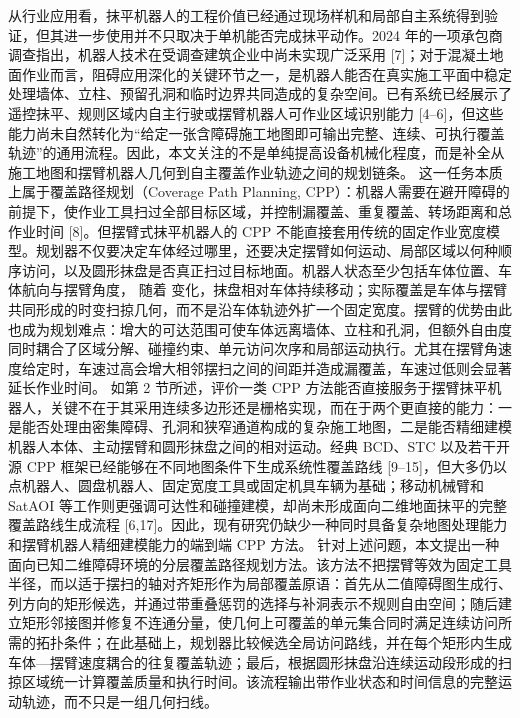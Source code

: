 {}从行业应用看，抹平机器人的工程价值已经通过现场样机和局部自主系统得到验证，但其进一步使用并不只取决于单机能否完成抹平动作。2024 年的一项承包商调查指出，机器人技术在受调查建筑企业中尚未实现广泛采用 [7]；对于混凝土地面作业而言，阻碍应用深化的关键环节之一，是机器人能否在真实施工平面中稳定处理墙体、立柱、预留孔洞和临时边界共同造成的复杂空间。已有系统已经展示了遥控抹平、规则区域内自主行驶或摆臂机器人可作业区域识别能力 [4–6]，但这些能力尚未自然转化为“给定一张含障碍施工地图即可输出完整、连续、可执行覆盖轨迹”的通用流程。因此，本文关注的不是单纯提高设备机械化程度，而是补全从施工地图和摆臂机器人几何到自主覆盖作业轨迹之间的规划链条。\markdownRendererParagraphSeparator
{}这一任务本质上属于覆盖路径规划（Coverage Path Planning, CPP）：机器人需要在避开障碍的前提下，使作业工具扫过全部目标区域，并控制漏覆盖、重复覆盖、转场距离和总作业时间 [8]。但摆臂式抹平机器人的 CPP 不能直接套用传统的固定作业宽度模型。规划器不仅要决定车体经过哪里，还要决定摆臂如何运动、局部区域以何种顺序访问，以及圆形抹盘是否真正扫过目标地面。机器人状态至少包括车体位置、车体航向与摆臂角度，\markdownRendererParagraphSeparator
{}\markdownRendererParagraphSeparator
{}随着 \markdownRendererInlineMath{\phi} 变化，抹盘相对车体持续移动；实际覆盖是车体与摆臂共同形成的时变扫掠几何，而不是沿车体轨迹外扩一个固定宽度。摆臂的优势由此也成为规划难点：增大的可达范围可使车体远离墙体、立柱和孔洞，但额外自由度同时耦合了区域分解、碰撞约束、单元访问次序和局部运动执行。尤其在摆臂角速度给定时，车速过高会增大相邻摆扫之间的间距并造成漏覆盖，车速过低则会显著延长作业时间。\markdownRendererParagraphSeparator
{}如第 2 节所述，评价一类 CPP 方法能否直接服务于摆臂抹平机器人，关键不在于其采用连续多边形还是栅格实现，而在于两个更直接的能力：一是能否处理由密集障碍、孔洞和狭窄通道构成的复杂施工地图，二是能否精细建模机器人本体、主动摆臂和圆形抹盘之间的相对运动。经典 BCD、STC 以及若干开源 CPP 框架已经能够在不同地图条件下生成系统性覆盖路线 [9–15]，但大多仍以点机器人、圆盘机器人、固定宽度工具或固定机具车辆为基础；移动机械臂和 SatAOI 等工作则更强调可达性和碰撞建模，却尚未形成面向二维地面抹平的完整覆盖路线生成流程 [6,17]。因此，现有研究仍缺少一种同时具备复杂地图处理能力和摆臂机器人精细建模能力的端到端 CPP 方法。\markdownRendererParagraphSeparator
{}针对上述问题，本文提出一种面向已知二维障碍环境的分层覆盖路径规划方法。该方法不把摆臂等效为固定工具半径，而以适于摆扫的轴对齐矩形作为局部覆盖原语：首先从二值障碍图生成行、列方向的矩形候选，并通过带重叠惩罚的选择与补洞表示不规则自由空间；随后建立矩形邻接图并修复不连通分量，使几何上可覆盖的单元集合同时满足连续访问所需的拓扑条件；在此基础上，规划器比较候选全局访问路线，并在每个矩形内生成车体—摆臂速度耦合的往复覆盖轨迹；最后，根据圆形抹盘沿连续运动段形成的扫掠区域统一计算覆盖质量和执行时间。该流程输出带作业状态和时间信息的完整运动轨迹，而不只是一组几何扫线。\markdownRendererParagraphSeparator
